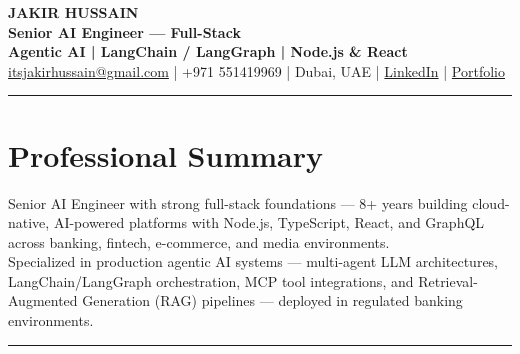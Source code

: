 \documentclass[10pt,a4paper]{article}
\newcommand{\NameSize}{\fontsize{22}{24}\selectfont}
\newcommand{\TitleSize}{\fontsize{10.8}{13}\selectfont}
\newcommand{\TagSize}{\fontsize{10}{12}\selectfont}
\newcommand{\BodySize}{\fontsize{9.7}{12}\selectfont}
\newcommand{\SmallBody}{\fontsize{9.2}{11.4}\selectfont}
\newcommand{\topdivider}{\color{rulecolor}\rule{\linewidth}{0.5pt}\color{primary}\vspace{0pt}}
\newcommand{\ATSspaceoff}{\ifdefined\pdfinterwordspaceoff\pdfinterwordspaceoff\fi}
\newcommand{\ATSspaceon}{\ifdefined\pdfinterwordspaceon\pdfinterwordspaceon\fi}
\begin{document}
\BodySize

\begin{center}

{\ATSspaceoff\NameSize \bfseries JAKIR HUSSAIN\ATSspaceon}\\[4pt]
{\TitleSize \bfseries Senior AI Engineer --- Full-Stack}\\[2pt]
{\TagSize \bfseries Agentic AI \;|\; LangChain / LangGraph \;|\; Node.js \& React}\\[6pt]

\href{mailto:itsjakirhussain@gmail.com}{itsjakirhussain@gmail.com} \;|\;
+971 551419969 \;|\;
Dubai, UAE \;|\;
\href{https://linkedin.com/in/iam-hussain}{LinkedIn} \;|\;
\href{https://iam-hussain.site}{Portfolio}

\end{center}
\vspace{-8pt}
\topdivider
\vspace{2pt}
\section*{Professional Summary}
\SmallBody
Senior AI Engineer with strong full-stack foundations --- 8+ years building cloud-native, AI-powered platforms with Node.js, TypeScript, React, and GraphQL across banking, fintech, e-commerce, and media environments.\\[5pt]

Specialized in production agentic AI systems — multi-agent LLM architectures, LangChain/LangGraph orchestration, MCP tool integrations, and Retrieval-Augmented Generation (RAG) pipelines — deployed in regulated banking environments.\\[8pt]

\vspace{-8pt}
\topdivider
\vspace{2pt}
\end{document}
